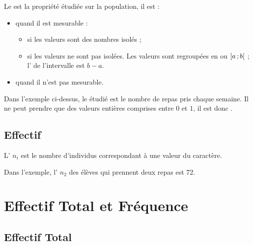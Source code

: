 \documentclass[12pt,a4paper]{article}
\begin{document}
\begin{mydef}

Le  est la propriété étudiée sur la population, il est :
\begin{itemize}
	\item {} quand il est mesurable :
		\begin{itemize}
			\item {} si les valeurs sont des nombres isolés ;
			\item {} si les valeurs ne sont pas isolées. Les valeurs sont regroupées en  ou   $\mbox{\ensuremath{\left[a\mathpunct{};b\right[}}$ ; l' de l'intervalle est $b -a$.
		\end{itemize}
	\item {} quand il n'est pas mesurable. %
\end{itemize}
\end{mydef}

\begin{myex}
	
	Dans l'exemple ci-dessus, le  étudié est le nombre de repas pris chaque semaine. Il ne peut prendre que des valeurs entières comprises entre $0$ et $1$, il est donc .
	
	
\end{myex}

\subsection{Effectif}

\begin{mydef}
	L' $n_i$ est le nombre d'individus correspondant à une valeur du caractère. 
	
\end{mydef}

\begin{myex}
	Dans l'exemple, l' $n_2$ des élèves qui prennent deux repas est 72.
\end{myex}
\section{Effectif Total et Fréquence}

\subsection{Effectif Total}
	
\end{document}
